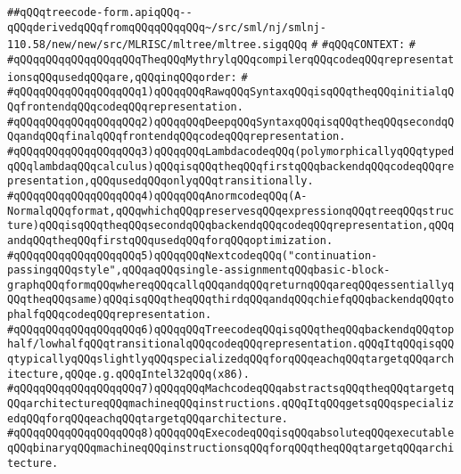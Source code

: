 \label{src/lib/compiler/back/low/treecode/treecode-form.api}
\verb|##qQQqtreecode-form.apiqQQq--qQQqderivedqQQqfromqQQqqQQqqQQq~/src/sml/nj/smlnj-110.58/new/new/src/MLRISC/mltree/mltree.sigqQQq|\newline
\verb|#|\newline
\verb|#qQQqCONTEXT:|\newline
\verb|#|\newline
\verb|#qQQqqQQqqQQqqQQqqQQqTheqQQqMythrylqQQqcompilerqQQqcodeqQQqrepresentationsqQQqusedqQQqare,qQQqinqQQqorder:|\newline
\verb|#|\newline
\verb|#qQQqqQQqqQQqqQQqqQQq1)qQQqqQQqRawqQQqSyntaxqQQqisqQQqtheqQQqinitialqQQqfrontendqQQqcodeqQQqrepresentation.|\newline
\verb|#qQQqqQQqqQQqqQQqqQQq2)qQQqqQQqDeepqQQqSyntaxqQQqisqQQqtheqQQqsecondqQQqandqQQqfinalqQQqfrontendqQQqcodeqQQqrepresentation.|\newline
\verb|#qQQqqQQqqQQqqQQqqQQq3)qQQqqQQqLambdacodeqQQq(polymorphicallyqQQqtypedqQQqlambdaqQQqcalculus)qQQqisqQQqtheqQQqfirstqQQqbackendqQQqcodeqQQqrepresentation,qQQqusedqQQqonlyqQQqtransitionally.|\newline
\verb|#qQQqqQQqqQQqqQQqqQQq4)qQQqqQQqAnormcodeqQQq(A-NormalqQQqformat,qQQqwhichqQQqpreservesqQQqexpressionqQQqtreeqQQqstructure)qQQqisqQQqtheqQQqsecondqQQqbackendqQQqcodeqQQqrepresentation,qQQqandqQQqtheqQQqfirstqQQqusedqQQqforqQQqoptimization.|\newline
\verb|#qQQqqQQqqQQqqQQqqQQq5)qQQqqQQqNextcodeqQQq("continuation-passingqQQqstyle",qQQqaqQQqsingle-assignmentqQQqbasic-block-graphqQQqformqQQqwhereqQQqcallqQQqandqQQqreturnqQQqareqQQqessentiallyqQQqtheqQQqsame)qQQqisqQQqtheqQQqthirdqQQqandqQQqchiefqQQqbackendqQQqtophalfqQQqcodeqQQqrepresentation.|\newline
\verb|#qQQqqQQqqQQqqQQqqQQq6)qQQqqQQqTreecodeqQQqisqQQqtheqQQqbackendqQQqtophalf/lowhalfqQQqtransitionalqQQqcodeqQQqrepresentation.qQQqItqQQqisqQQqtypicallyqQQqslightlyqQQqspecializedqQQqforqQQqeachqQQqtargetqQQqarchitecture,qQQqe.g.qQQqIntel32qQQq(x86).|\newline
\verb|#qQQqqQQqqQQqqQQqqQQq7)qQQqqQQqMachcodeqQQqabstractsqQQqtheqQQqtargetqQQqarchitectureqQQqmachineqQQqinstructions.qQQqItqQQqgetsqQQqspecializedqQQqforqQQqeachqQQqtargetqQQqarchitecture.|\newline
\verb|#qQQqqQQqqQQqqQQqqQQq8)qQQqqQQqExecodeqQQqisqQQqabsoluteqQQqexecutableqQQqbinaryqQQqmachineqQQqinstructionsqQQqforqQQqtheqQQqtargetqQQqarchitecture.|\newline

